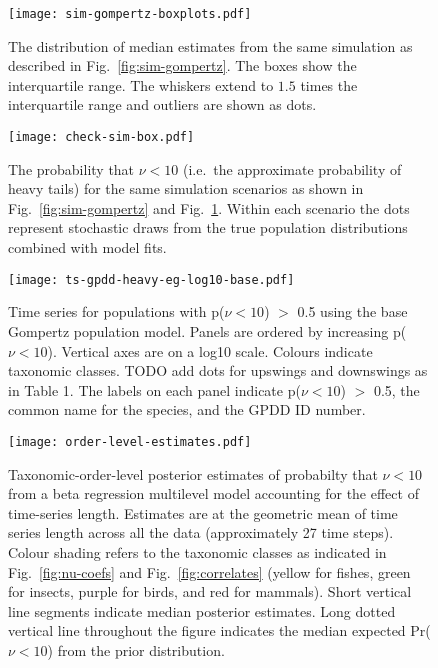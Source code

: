 \begin{figure}[htbp]
\begin{center}
\texttt{[image: sim-gompertz-boxplots.pdf]}
\caption{The distribution of median estimates from the same simulation as described in Fig.~\ref{fig:sim-gompertz}. The boxes show the interquartile range. The whiskers extend to $1.5$ times the interquartile range and outliers are shown as dots.}
\label{fig:sim-gompertz-boxplots}
\end{center}
\end{figure}


\begin{figure}[htbp]
\begin{center}
\texttt{[image: check-sim-box.pdf]}
\caption{The probability that $\nu < 10$ (i.e.\ the approximate probability of heavy tails) for the same simulation scenarios as shown in Fig.~\ref{fig:sim-gompertz} and Fig.~\ref{fig:sim-gompertz-boxplots}. Within each scenario the dots represent stochastic draws from the true population distributions combined with model fits.}
\label{fig:sim-prob}
\end{center}
\end{figure}


\begin{figure}[htbp]
\begin{center}
\texttt{[image: ts-gpdd-heavy-eg-log10-base.pdf]}
\caption{Time series for populations with p($\nu < 10$) $>$ 0.5 using the base Gompertz population model. Panels are ordered by increasing p($\nu < 10$). Vertical axes are on a log10 scale. Colours indicate taxonomic classes. TODO add dots for upswings and downswings as in Table 1. The labels on each panel indicate p($\nu < 10$) $>$ 0.5, the common name for the species, and the GPDD ID number.}
\label{fig:heavy-ts}
\end{center}
\end{figure}

\clearpage

\begin{figure}[htbp]
\begin{center}
\texttt{[image: order-level-estimates.pdf]}
\caption{
Taxonomic-order-level posterior estimates of probabilty that $\nu < 10$ from a beta regression multilevel model accounting for the effect of time-series length. Estimates are at the geometric mean of time series length across all the data (approximately 27 time steps). Colour shading refers to the taxonomic classes as indicated in Fig.~\ref{fig:nu-coefs} and Fig.~\ref{fig:correlates} (yellow for fishes, green for insects, purple for birds, and red for mammals). Short vertical line segments indicate median posterior estimates. Long dotted vertical line throughout the figure indicates the median expected Pr($\nu < 10$) from the prior distribution.
}
\label{fig:order-estimates}
\end{center}
\end{figure}

